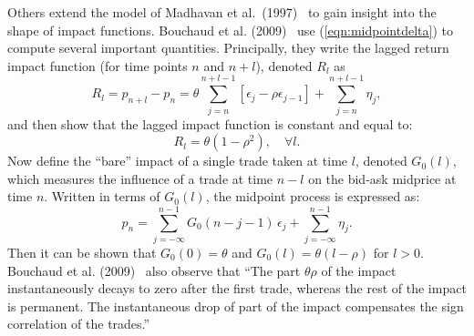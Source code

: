 Others extend the model of Madhavan et al.~(1997)~\cite{} to gain insight into the shape of impact functions.  Bouchaud et al. (2009)~\cite{bouchaud2009} use (\ref{eqn:midpointdelta}) to compute several important quantities. Principally, they write the lagged return impact function (for time points $n$ and $n+l$), denoted $R_l$ as
	\begin{equation}\label{eqn:rlittlel}
	R_l = p_{n+l}-p_n = \theta \sum_{j=n}^{n+l-1}[\epsilon_j - \rho \epsilon_{j-1}]+ \sum_{j=n}^{n+l-1}\eta_j,
	\end{equation}
and then show that the lagged impact function is constant and equal to:
	\begin{equation}\label{eqn:rlittlel2}
	R_l = \theta (1-\rho^2), \quad \forall l.
	\end{equation}
Now define the ``bare'' impact of a single trade taken at time $l$, denoted $G_0(l)$, which measures the influence of a trade at time $n-l$ on the bid-ask midprice at time $n$. Written in terms of $G_0(l)$, the midpoint process is expressed as:
	\begin{equation}\label{eqn:plittlen}
	p_n = \sum_{j=-\infty}^{n-1}G_0(n-j-1)\,\epsilon_j + \sum_{j=-\infty}^{n-1}\eta_j.
	\end{equation}
Then it can be shown that $G_0(0) = \theta$ and $G_0(l) = \theta(l-\rho)$ for $l>0$. Bouchaud et al. (2009)~\cite{bouchaud2009} also observe that ``The part $\theta \rho$ of the impact instantaneously decays to zero after the first trade, whereas the rest of the impact is permanent. The instantaneous drop of part of the impact compensates the sign correlation of the trades.''



